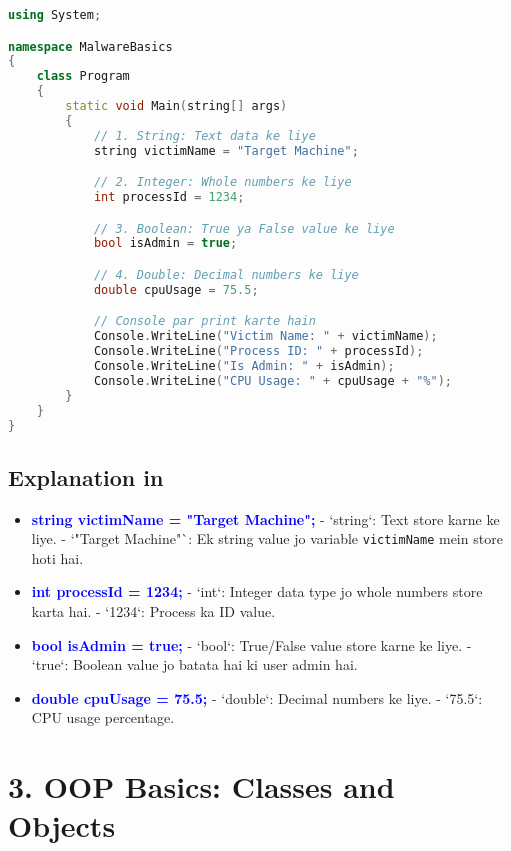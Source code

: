 \documentclass[12pt]{article}
\begin{document}
\begin{lstlisting}[language=C++, caption=Variables in C#]
using System;

namespace MalwareBasics
{
    class Program
    {
        static void Main(string[] args)
        {
            // 1. String: Text data ke liye
            string victimName = "Target Machine";

            // 2. Integer: Whole numbers ke liye
            int processId = 1234;

            // 3. Boolean: True ya False value ke liye
            bool isAdmin = true;

            // 4. Double: Decimal numbers ke liye
            double cpuUsage = 75.5;

            // Console par print karte hain
            Console.WriteLine("Victim Name: " + victimName);
            Console.WriteLine("Process ID: " + processId);
            Console.WriteLine("Is Admin: " + isAdmin);
            Console.WriteLine("CPU Usage: " + cpuUsage + "%");
        }
    }
}
\end{lstlisting}

\subsection*{Explanation in  }

\begin{itemize}
    \item \textbf{\textcolor{blue}{string victimName = "Target Machine";}}  
    - `string`: Text store karne ke liye.  
    - `"Target Machine"`: Ek string value jo variable \texttt{victimName} mein store hoti hai.

    \item \textbf{\textcolor{blue}{int processId = 1234;}}  
    - `int`: Integer data type jo whole numbers store karta hai.  
    - `1234`: Process ka ID value.

    \item \textbf{\textcolor{blue}{bool isAdmin = true;}}  
    - `bool`: True/False value store karne ke liye.  
    - `true`: Boolean value jo batata hai ki user admin hai.

    \item \textbf{\textcolor{blue}{double cpuUsage = 75.5;}}  
    - `double`: Decimal numbers ke liye.  
    - `75.5`: CPU usage percentage.
\end{itemize}

\section*{\textbf{3. OOP Basics: Classes and Objects}}
\end{document}

